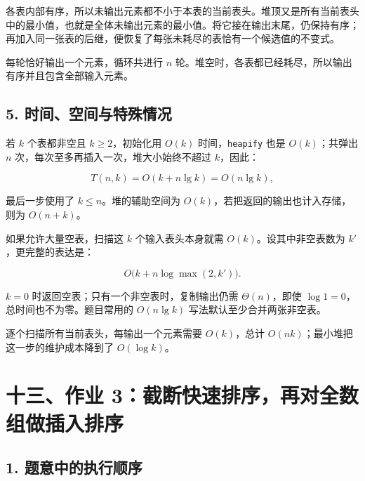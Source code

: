 \documentclass[
  UTF8,fontset=none,zihao=5]{ctexart}
\let\OldSection\section
\renewcommand{\section}{\Needspace{5\baselineskip}\OldSection}
\let\OldSubsection\subsection
\renewcommand{\subsection}{\Needspace{4\baselineskip}\OldSubsection}
\begin{document}
各表内部有序，所以未输出元素都不小于本表的当前表头。堆顶又是所有当前表头中的最小值，也就是全体未输出元素的最小值。将它接在输出末尾，仍保持有序；再加入同一张表的后继，便恢复了每张未耗尽的表恰有一个候选值的不变式。

每轮恰好输出一个元素，循环共进行 \(n\)
轮。堆空时，各表都已经耗尽，所以输出有序并且包含全部输入元素。

\hypertarget{ux65f6ux95f4ux7a7aux95f4ux4e0eux7279ux6b8aux60c5ux51b5}{%
\subsection{5.
时间、空间与特殊情况}\label{ux65f6ux95f4ux7a7aux95f4ux4e0eux7279ux6b8aux60c5ux51b5}}

若 \(k\) 个表都非空且 \(k\ge2\)，初始化用 \(O(k)\)
时间，\texttt{heapify} 也是 \(O(k)\)；共弹出 \(n\)
次，每次至多再插入一次，堆大小始终不超过 \(k\)，因此：

\[
T(n,k)=O(k+n\lg k)=O(n\lg k),
\]

最后一步使用了 \(k\le n\)。堆的辅助空间为
\(O(k)\)，若把返回的输出也计入存储，则为 \(O(n+k)\)。

如果允许大量空表，扫描这 \(k\) 个输入表头本身就需
\(O(k)\)。设其中非空表数为 \(k'\)，更完整的表达是：

\[
O\bigl(k+n\log\max(2,k')\bigr).
\]

\(k=0\) 时返回空表；只有一个非空表时，复制输出仍需 \(\Theta(n)\)，即使
\(\log1=0\)，总时间也不为零。题目常用的 \(O(n\lg k)\)
写法默认至少合并两张非空表。

逐个扫描所有当前表头，每输出一个元素需要 \(O(k)\)，总计
\(O(nk)\)；最小堆把这一步的维护成本降到了 \(O(\log k)\)。

\hypertarget{ux5341ux4e09ux4f5cux4e1a-3ux622aux65adux5febux901fux6392ux5e8fux518dux5bf9ux5168ux6570ux7ec4ux505aux63d2ux5165ux6392ux5e8f}{%
\section{十三、作业
3：截断快速排序，再对全数组做插入排序}\label{ux5341ux4e09ux4f5cux4e1a-3ux622aux65adux5febux901fux6392ux5e8fux518dux5bf9ux5168ux6570ux7ec4ux505aux63d2ux5165ux6392ux5e8f}}

\hypertarget{ux9898ux610fux4e2dux7684ux6267ux884cux987aux5e8f}{%
\subsection{1.
题意中的执行顺序}\label{ux9898ux610fux4e2dux7684ux6267ux884cux987aux5e8f}}
\end{document}
